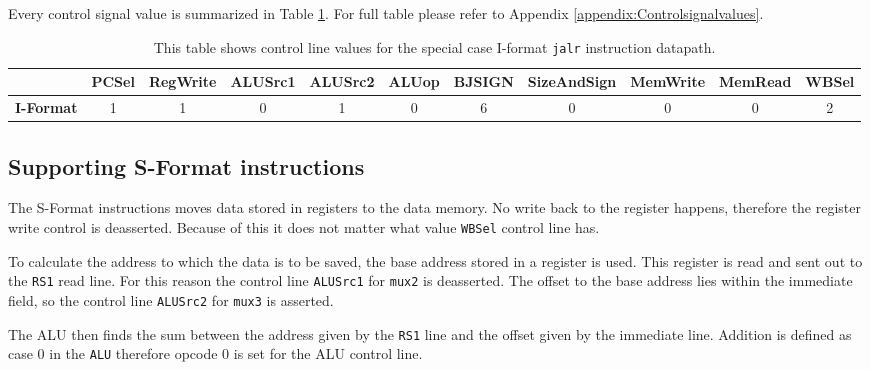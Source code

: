             Every control signal value is summarized in Table \ref{table:JALRFORMAT}. For full table please refer to Appendix \ref{appendix:Controlsignalvalues}.
            
            \begin{table}[h!]
                \small
                \hspace{-2.4cm}
                \begin{tabular}{|c||c|c|c|c|c|c|c|c|c|c|}
                	\hline
                	                  & \textbf{PCSel} & \textbf{RegWrite} & \textbf{ALUSrc1} & \textbf{ALUSrc2} & \textbf{ALUop} & \textbf{BJSIGN} & \textbf{SizeAndSign} & \textbf{MemWrite} & \textbf{MemRead} & \textbf{WBSel} \\ \hline\hline
                	\textbf{I-Format} &       1        &         1         &        0         &        1         &       0        &        6        &         0          &         0         &        0         &       2        \\ \hline
                \end{tabular}
                \caption{This table shows control line values for the special case I-format \texttt{jalr} instruction datapath. }
                \label{table:JALRFORMAT}
            \end{table}
        
    
    \subsection{Supporting S-Format instructions}
        The S-Format instructions moves data stored in registers to the data memory. No write back to the register happens, therefore the register write control is deasserted. Because of this it does not matter what value \texttt{WBSel} control line has. 
        
        To calculate the address to which the data is to be saved, the base address stored in a register is used. This register is read and sent out to the \texttt{RS1} read line. For this reason the control line \texttt{ALUSrc1} for \texttt{mux2} is deasserted. The offset to the base address lies within the immediate field, so the control line \texttt{ALUSrc2} for \texttt{mux3} is asserted.
        
        The ALU then finds the sum between the address given by the \texttt{RS1} line and the offset given by the immediate line. Addition is defined as case 0 in the \texttt{ALU} therefore opcode 0 is set for the ALU control line.
        
